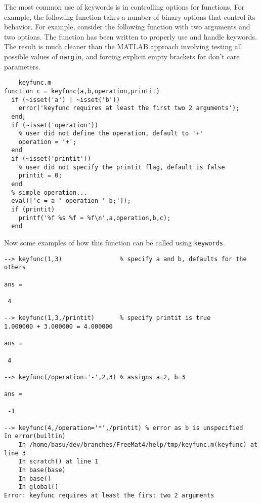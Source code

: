 The most common use of keywords is in controlling options for
functions.  For example, the following function takes a number
of binary options that control its behavior.  For example,
consider the following function with two arguments and two
options.  The function has been written to properly use and
handle keywords.  The result is much cleaner than the MATLAB
approach involving testing all possible values of \verb|nargin|,
and forcing explicit empty brackets for don't care parameters.
\begin{verbatim}
    keyfunc.m
function c = keyfunc(a,b,operation,printit)
  if (~isset('a') | ~isset('b')) 
    error('keyfunc requires at least the first two 2 arguments'); 
  end;
  if (~isset('operation'))
    % user did not define the operation, default to '+'
    operation = '+';
  end
  if (~isset('printit'))
    % user did not specify the printit flag, default is false
    printit = 0;
  end
  % simple operation...
  eval(['c = a ' operation ' b;']);
  if (printit) 
    printf('%f %s %f = %f\n',a,operation,b,c);
  end
\end{verbatim}
Now some examples of how this function can be called using
\verb|keywords|.
\begin{verbatim}
--> keyfunc(1,3)                % specify a and b, defaults for the others

ans = 

 4 

--> keyfunc(1,3,/printit)       % specify printit is true
1.000000 + 3.000000 = 4.000000

ans = 

 4 

--> keyfunc(/operation='-',2,3) % assigns a=2, b=3

ans = 

 -1 

--> keyfunc(4,/operation='*',/printit) % error as b is unspecified
In error(builtin)
    In /home/basu/dev/branches/FreeMat4/help/tmp/keyfunc.m(keyfunc) at line 3
    In scratch() at line 1
    In base(base)
    In base()
    In global()
Error: keyfunc requires at least the first two 2 arguments
\end{verbatim}
